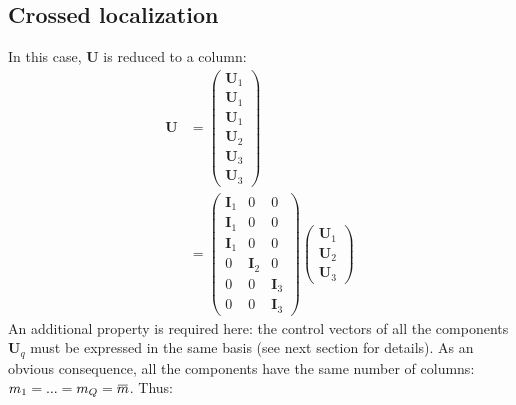 \documentclass[12pt]{scrartcl}
\newcommand{\overbar}[1]{\mkern 1.5mu\overline{\mkern-1.5mu#1\mkern-1.5mu}\mkern 1.5mu}
\begin{document}
\subsection{Crossed localization}
In this case, $\mathbf{U}$ is reduced to a column:
\begin{align}
\mathbf{U} & = \left( \begin{array}{c}
\mathbf{U}_1 \\
\mathbf{U}_1 \\
\mathbf{U}_1 \\[0.3ex]
\hline
\mathbf{U}_2 \\[0.3ex]
\hline
\mathbf{U}_3 \\
\mathbf{U}_3
\end{array} \right) \nonumber \\
& = \left( \begin{array}{c|c|c}
\mathbf{I}_1 & 0 & 0 \\
\mathbf{I}_1 & 0 & 0 \\
\mathbf{I}_1 & 0 & 0 \\[0.3ex]
\hline
0 & \mathbf{I}_2 & 0 \\[0.3ex]
\hline
0 & 0 & \mathbf{I}_3 \\
0 & 0 & \mathbf{I}_3
\end{array} \right)
\left( \begin{array}{c}
\mathbf{U}_1 \\[0.3ex]
\hline
\mathbf{U}_2 \\[0.3ex]
\hline
\mathbf{U}_3
\end{array} \right)
\end{align}
An additional property is required here: the control vectors of all the components $\mathbf{U}_q$ must be expressed in the same basis (see next section for details). As an obvious consequence, all the components have the same number of columns: $m_1 = ... = m_Q = \overbar{m}$. Thus:
\end{document}
